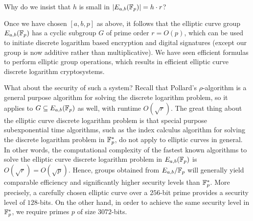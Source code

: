 \begin{exercise}
    Why do we insist that $h$ is small in $|E_{a,b}(\mathbb{F}_p)| = h \cdot r$? 
\end{exercise}

Once we have chosen $[a, b, p]$ as above, it follows that the elliptic curve 
group $E_{a,b}(\mathbb{F}_p)$ has a cyclic subgroup $G$ of prime order $r = O(p)$, 
which can be used to initiate discrete logarithm based encryption and digital
signatures (except our group is now additive rather than multiplicative). 
We have seen efficient formulas to perform elliptic group operations, which 
results in efficient elliptic curve discrete logarithm cryptosystems. 

What about the security of such a system? Recall that Pollard's $\rho$-algorithm 
is a general purpose algorithm for solving the discrete logarithm problem, 
so it applies to $G \subseteq E_{a,b}(\mathbb{F}_p)$ as well, with runtime $O(\sqrt r)$. 
The great thing about the elliptic curve discrete logarithm problem is that 
special purpose subexponential time algorithms, such as the index calculus 
algorithm for solving the discrete logarithm problem in $\mathbb{F}_p^*$, do 
not apply to elliptic curves in general. In other words, the computational 
complexity of the fastest known algorithms to solve the elliptic curve 
discrete logarithm problem in $E_{a,b}(\mathbb{F}_p)$ is $O(\sqrt r) = O(\sqrt p)$. 
Hence, groups obtained from $E_{a,b}/\mathbb{F}_p$ will generally yield comparable 
efficiency and significantly higher security levels than $\mathbb{F}_p^*$. 
More precisely, a carefully chosen elliptic curve over a $256$-bit prime 
provides a security level of $128$-bits. On the other hand, in order to 
achieve the same security level in $\mathbb{F}_p^*$, we require primes $p$ of 
size $3072$-bits. 